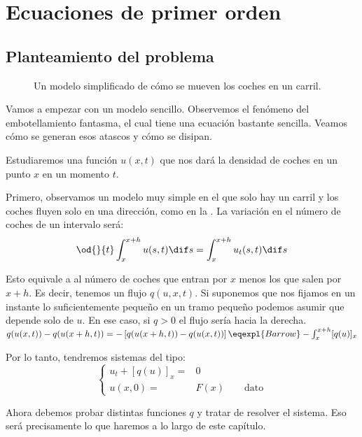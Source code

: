 \chapter{Ecuaciones de primer orden}

	\section{Planteamiento del problema}
	\label{sec:PlanteamientoPrimerOrden}

	\begin{figure}[thbp]
	\centering
	\caption{Un modelo simplificado de cómo se mueven los coches en un carril.}
	\label{fig:CochesCarril}
	\end{figure}

	Vamos a empezar con un modelo sencillo. Observemos el fenómeno del embotellamiento fantasma, el cual tiene una ecuación bastante sencilla. Veamos cómo se generan esos atascos y cómo se disipan.

	Estudiaremos una función $u(x,t)$ que nos dará la densidad de coches en un punto $x$ en un momento $t$.

	Primero, observamos un modelo muy simple en el que solo hay un carril y los coches fluyen solo en una dirección, como en la . La variación en el número de coches de un intervalo será:
	\[ \od{}{t} \int^{x+h}_{x} u(s,t) \dif s = \int^{x+h}_{x} u_t(s,t) \dif s \]

	Esto equivale a al número de coches que entran por $x$ menos los que salen por $x + h$. Es decir, tenemos un flujo $q(u, x, t)$. Si suponemos que nos fijamos en un instante lo suficientemente pequeño en un tramo pequeño podemos asumir que depende solo de $u$. En ese caso, si $q > 0$ el flujo sería hacia la derecha.
	\( q(u(x,t)) - q(u(x+h,t)) = -\left[ q(u(x+h,t)) -  q(u(x,t)) \right] \eqexpl{Barrow} -\int^{x+h}_{x} [q(u)]_{x}
	\label{eq:BaseFlujo}\)

	Por lo tanto, tendremos sistemas del tipo:
	\begin{equation}
	\left\{
	\begin{array}{rl}
	u_t + [q(u)]_{x} =&\!\!\! 0 \\
	u(x, 0) =&\!\!\! F(x) \quad \quad \text{dato}
	\end{array}
	\right. \label{eq:ModeloAtasco}
	\end{equation}

	Ahora debemos probar distintas funciones $q$ y tratar de resolver el sistema. Eso será precisamente lo que haremos a lo largo de este capítulo.

